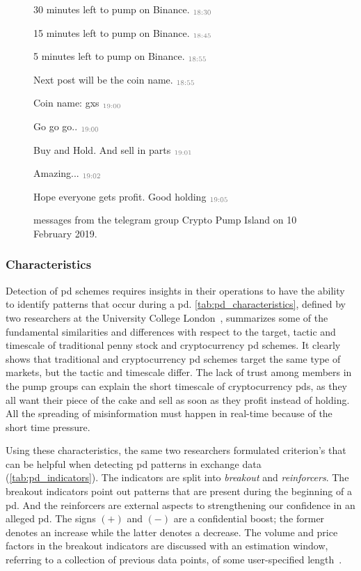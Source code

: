 \begin{figure}[ht]
    \begin{leftbubbles}
    30 minutes left to pump on Binance. $\color{gray}_{\text{18:30}}$
    
    15 minutes left to pump on Binance. $\color{gray}_{\text{18:45}}$
    
    5 minutes left to pump on Binance. $\color{gray}_{\text{18:55}}$
    
    Next post will be the coin name. $\color{gray}_{\text{18:55}}$
    
    Coin name: gxs $\color{gray}_{\text{19:00}}$
    
    Go go go.. $\color{gray}_{\text{19:00}}$

    Buy and Hold. And sell in parts $\color{gray}_{\text{19:01}}$
    
    Amazing... $\color{gray}_{\text{19:02}}$
    
    Hope everyone gets profit.
    Good holding $\color{gray}_{\text{19:05}}$
    \end{leftbubbles}
    \caption[\Acl{pd} group insight]{messages from the telegram group Crypto Pump Island on 10 February 2019.}
    \label{fig:chat_pump}
\end{figure}

\subsubsection{Characteristics}
Detection of \ac{pd} schemes requires insights in their operations to have the ability to identify patterns that occur during a \ac{pd}. \autoref{tab:pd_characteristics}, defined by two researchers at the University College London~\cite{P&D_anatomy}, summarizes some of the fundamental similarities and differences with respect to the target, tactic and timescale of traditional penny stock and cryptocurrency \ac{pd} schemes. It clearly shows that traditional and cryptocurrency \ac{pd} schemes target the same type of markets, but the tactic and timescale differ. The lack of trust among members in the pump groups can explain the short timescale of cryptocurrency \acp{pd}, as they all want their piece of the cake and sell as soon as they profit instead of holding. All the spreading of misinformation must happen in real-time because of the short time pressure.



Using these characteristics, the same two researchers \cite{P&D_anatomy} formulated criterion's that can be helpful when detecting \ac{pd} patterns in exchange data (\autoref{tab:pd_indicators}). The indicators are split into \emph{breakout} and \emph{reinforcers}. The breakout indicators point out patterns that are present during the beginning of a \ac{pd}. And the reinforcers are external aspects to strengthening our confidence in an alleged \ac{pd}. The signs $(+)$ and $(-)$ are a confidential boost; the former denotes an increase while the latter denotes a decrease. The volume and price factors in the breakout indicators are discussed with an estimation window, referring to a collection of previous data points, of some user-specified length~\cite{P&D_anatomy}.

